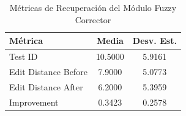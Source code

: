 \begin{table}[ht]
\centering
\caption{Métricas de Recuperación del Módulo Fuzzy Corrector}
\label{tab:fuzzy_metrics}
\begin{tabular}{lcc}
\toprule
\textbf{Métrica} & \textbf{Media} & \textbf{Desv. Est.} \\
\midrule
Test ID & 10.5000 & 5.9161 \\
Edit Distance Before & 7.9000 & 5.0773 \\
Edit Distance After & 6.2000 & 5.3959 \\
Improvement & 0.3423 & 0.2578 \\
\bottomrule
\end{tabular}
\end{table}